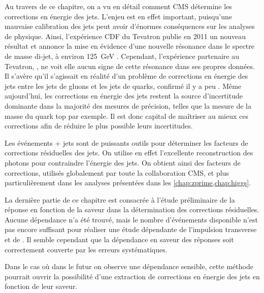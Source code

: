 Au travers de ce chapitre, on a vu en détail comment CMS détermine les corrections en énergie des jets. L'enjeu est en effet important, puisqu'une mauvaise calibration des jets peut avoir d'énormes conséquences sur les analyses de physique. Ainsi, l'expérience CDF du Tevatron publie en 2011 un nouveau résultat et annonce la mise en évidence d'une nouvelle résonance dans le spectre de masse di-jet, à environ \SI{125}{\GeV} \citep{CDF_old}. Cependant, l'expérience partenaire au Tevatron, \dzero, ne voit elle aucun signe de cette résonance dans ses propres données. Il s'avère qu'il s'agissait en réalité d'un problème de corrections en énergie des jets entre les jets de gluons et les jets de quarks, confirmé il y a peu \citep{CDF_new}. Même aujourd'hui, les corrections en énergie des jets restent la source d'incertitude dominante dans la majorité des mesures de précision, telles que la mesure de la masse du quark top par exemple. Il est donc capital de maîtriser au mieux ces corrections afin de réduire le plus possible leurs incertitudes.

\bigskip

Les événements \Pphoton + jets sont de puissants outils pour déterminer les facteurs de corrections résiduelles des jets. On utilise en effet l'excellente reconstruction des photons pour contraindre l'énergie des jets. On obtient ainsi des facteurs de corrections, utilisés globalement par toute la collaboration CMS, et plus particulièrement dans les analyses présentées dans les \cref{chap:zprime,chap:higgs}.

\bigskip

La dernière partie de ce chapitre est consacrée à l'étude préliminaire de la réponse en fonction de la saveur dans la détermination des corrections résiduelles. Aucune dépendance n'a été trouvé, mais le nombre d'événements disponible n'est pas encore suffisant pour réaliser une étude dépendante de l'impulsion transverse et de \aeta. Il semble cependant que la dépendance en saveur des réponses soit correctement couverte par les erreurs systématiques.

Dans le cas où dans le futur on observe une dépendance sensible, cette méthode pourrait ouvrir la possibilité d'une extraction de corrections en énergie des jets en fonction de leur saveur.